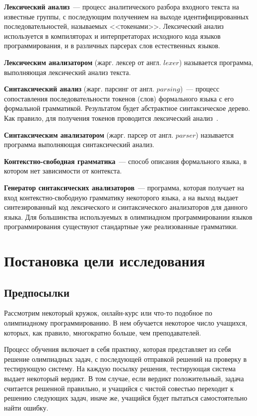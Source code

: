 \textbf{Лексический анализ}~--- процесс аналитического разбора 
входного текста на известные группы, с последующим получением на выходе 
идентифицированных последовательностей, называемых <<токенами>>. 
Лексический анализ используется в компиляторах и интерпретаторах исходного кода языков программирования, 
и в различных парсерах слов естественных языков.

\textbf{Лексическим анализатором} (жарг. лексер от англ. $lexer$) называется программа, выполняющая лексический анализ текста.

\textbf{Синтаксический анализ} (жарг. парсинг от англ. $parsing$)~--- процесс сопоставления последовательности токенов (слов)
формального языка с его формальной грамматикой. Результатом будет абстрактное синтаксическое дерево. Как правило, для получения
токенов проводится лексический анализ~\cite{syntax}.

\textbf{Синтаксическим анализатором} (жарг. парсер от англ. $parser$) называется программа выполняющая синтаксический анализ.

\textbf{Контекстно-свободная грамматика}~---  способ описания формального языка, в котором нет зависимости от контекста.

\textbf{Генератор синтаксических анализаторов}~--- программа, которая получает на вход контекстно-свободную грамматику 
некоторого языка, а на выход выдает синтезированный код лексического и синтаксического анализаторов для данного языка.
Для большинства используемых в олимпиадном программировании языков программирования 
существуют стандартные уже реализованные грамматики.

\section{Постановка цели исследования}
\subsection{Предпосылки}

Рассмотрим некоторый кружок, онлайн-курс или что-то подобное по олимпиадному программированию. 
В нем обучается некоторое число учащихся, которых, как правило, многократно больше, чем преподавателей.

Процесс обучения включает в себя практику, которая представляет из себя решение олимпиадных задач, с последующей
отправкой решений на проверку в тестирующую систему. На каждую посылку решения, тестирующая система выдает некоторый вердикт.
В том случае, если вердикт положительный, задача считается решенной правильно, и учащийся с чистой совестью переходит к решению
следующих задач, иначе же, учащийся будет пытаться самостоятельно найти ошибку.

